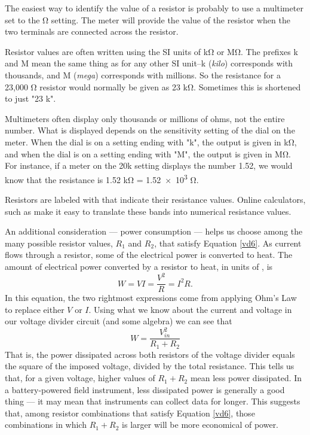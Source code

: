 \begin{kaobox}[frametitle=How to determine the value of a resistor]
The easiest way to identify the value of a resistor is probably to use a multimeter set to the \si{\ohm} setting.  
The meter will provide the value of the resistor when the two terminals are connected across the resistor.

Resistor values are often written using the SI units of \si{\kohm} or \si{\Mohm}.  
The prefixes k and M mean the same thing as for any other SI unit--k (\emph{kilo}) corresponds with thousands, and M (\emph{mega}) corresponds with millions. 
So the resistance for a 23,000 \si{\ohm} resistor would normally be given as \num{23} \si{\kohm}.
Sometimes this is shortened to just "\num{23} k".
  
Multimeters often display only thousands or millions of ohms, not the entire number.
What is displayed depends on the sensitivity setting of the dial on the meter.
When the dial is on a setting ending with "k", the output is given in \si{\kohm}, and when the dial is on a setting ending with "M", the output is given in \si{\Mohm}.
For instance, if a meter on the 20k setting displays the number 1.52, we would know that the resistance is 1.52 \si{\kohm} = \num{1.52e3} \si{\ohm}.  

Resistors are labeled with  that indicate their resistance values. Online calculators, such as  make it easy to translate these bands into numerical resistance values.
\end{kaobox}

An additional consideration --- power consumption --- helps us choose among the many possible resistor values, $R_1$ and $R_2$, that satisfy Equation \ref{vd6}.
As current flows through a resistor, some of the electrical power is converted to heat.
The amount of electrical power converted by a resistor to heat, in units of , is
\begin{equation}\label{watts}
W = V I = \frac{V^2}{R} = I^2 R.
\end{equation}
In this equation, the two rightmost expressions come from applying Ohm's Law to replace either $V$ or $I$.
Using what we know about the current and voltage in our voltage divider circuit (and some algebra) we can see that
\begin{equation}\label{watts2}
W = \frac{V_{in}^2}{R_1+R_2}
\end{equation}
That is, the power dissipated across both resistors of the voltage divider equals the square of the imposed voltage, divided by the total resistance.
This tells us that, for a given voltage, higher values of $R_1+R_2$ mean less power dissipated.
In a battery-powered field instrument, less dissipated power is generally a good thing --- it may mean that instruments can collect data for longer.
This suggests that, among resistor combinations that satisfy Equation \ref{vd6}, those combinations in which $R_1+R_2$ is larger will be more economical of power.

